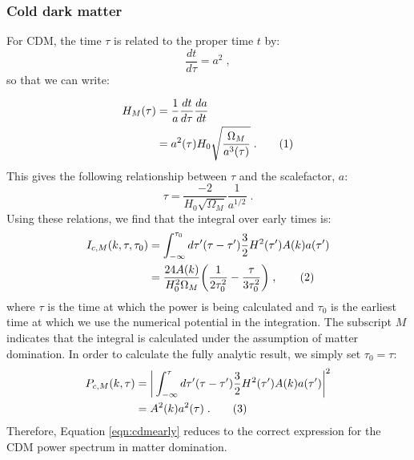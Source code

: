 \documentclass[twocolumn,superscriptaddress,prd]{revtex4}
\newcommand\numberthis{\addtocounter{equation}{1}\tag{\theequation}}
\begin{document}
\subsubsection{Cold dark matter}\label{sec:CDMmatter}
For CDM, the time $\tau$ is related to the proper
time $t$ by:
\begin{equation}
  \frac{ d t}{ d \tau} = a^2 \;,
\end{equation}
so that we can write:

\begin{align*}
  H_M(\tau) &= \frac{1}{a} \frac{d t}{ d \tau} \frac{da}{dt}\\
  &= a^2(\tau) H_0 \sqrt{ \frac{\Omega_M}{a^3(\tau)}} \;. \numberthis
\end{align*}
This gives the following relationship between $\tau$ and the
scalefactor, $a$:
\begin{equation}
  \tau = \frac{-2}{H_0 \sqrt{\Omega_M} } \frac{1}{a^{1/2} } \;.
\end{equation}
Using these relations, we find that the integral over early times is:
\begin{align*}\label{eqn:cdmearly}
  I_{c,M}(k,\tau,\tau_0) &= \int_{-\infty}^{\tau_0}d\tau' (\tau-\tau') \frac{3}{2}
              H^2(\tau') A(k) a(\tau')\\
          &= \frac{24 A(k)}{H_0^2 \Omega_M} \bigg( \frac{1}{2 \tau_0^2} - \frac{
       \tau}{3 \tau_0^2} \bigg)\;, \numberthis
\end{align*}
where $\tau$ is the time at which the power is being calculated and
$\tau_0$ is the earliest time at which we use the numerical potential
in the integration.  The subscript $M$ indicates that the integral is
calculated under the assumption of matter domination.  In
order to calculate the fully analytic result, we simply set
$\tau_0 = \tau$:
\begin{align*}
  P_{c,M}(k,\tau) &= \bigg|\int_{-\infty}^{\tau} d\tau' (\tau - \tau')\frac{3}{2} H^2(\tau') A(k)
  a(\tau')\bigg|^2 \\
& = A^2(k)
    a^2(\tau) \;. \numberthis
\end{align*}
Therefore, Equation \eqref{eqn:cdmearly} reduces to the
correct expression for the CDM power spectrum in matter
domination. 
\end{document}
